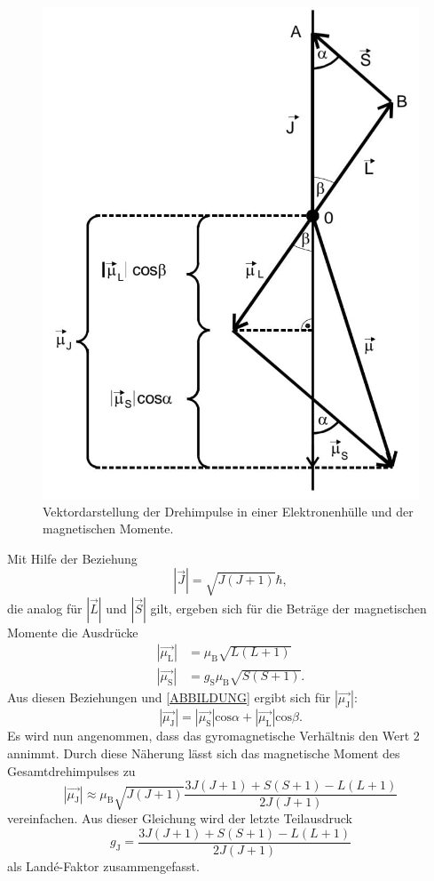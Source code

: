 \begin{figure}[H]
	\centering
	\includegraphics[width=0.6\linewidth]{data/vektordiagramm.jpeg}
	\caption{Vektordarstellung der Drehimpulse in einer Elektronenhülle und der magnetischen Momente.}
	\label{fig:vektordarstellung}
\end{figure}

Mit Hilfe der Beziehung
\begin{equation*}
\left|\vec{J}\right| = \sqrt{J(J+1)}\hbar,
\end{equation*}
die analog für $\left|\vec{L}\right|$ und $\left|\vec{S}\right|$ gilt, ergeben sich für die Beträge der magnetischen Momente die Ausdrücke
\begin{align}
\label{eq:eq3}
\left|\vec{\mu_\text{L}}\right| &= \mu_\text{B}\sqrt{L(L+1)} \\
\left|\vec{\mu_\text{S}}\right| &= g_\text{S}\mu_\text{B}\sqrt{S(S+1)}.
\end{align}
Aus diesen Beziehungen und \autoref{ABBILDUNG} ergibt sich für $\left|\vec{\mu_\text{J}}\right|$:
\begin{equation}
\left|\vec{\mu_\text{J}}\right| = \left|\vec{\mu_\text{S}}\right|\text{cos}\alpha + \left|\vec{\mu_\text{L}}\right|\text{cos}\beta.
\end{equation}
Es wird nun angenommen, dass das gyromagnetische Verhältnis den Wert $2$ annimmt. Durch diese Näherung lässt sich das magnetische Moment des Gesamtdrehimpulses zu
\begin{equation}
\label{eq:eq4}
\left|\vec{\mu_\text{J}}\right| \approx \mu_\text{B} \sqrt{J(J+1)} \frac{3J(J+1)+S(S+1)-L(L+1)}{2J(J+1)}
\end{equation}
vereinfachen. Aus dieser Gleichung wird der letzte Teilausdruck
\begin{equation*}
g_\text{J} = \frac{3J(J+1)+S(S+1)-L(L+1)}{2J(J+1)}
\end{equation*}
als Land\'{e}-Faktor zusammengefasst.

